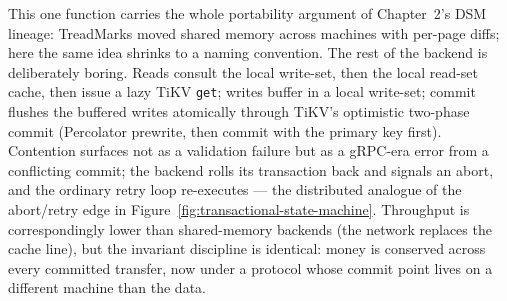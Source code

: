 This one function carries the whole portability argument of Chapter~2's DSM
lineage: TreadMarks moved shared memory across machines with per-page diffs;
here the same idea shrinks to a naming convention. The rest of the backend is
deliberately boring. Reads consult the local write-set, then the local
read-set cache, then issue a lazy TiKV \texttt{get}; writes buffer in a local
write-set; commit flushes the buffered writes atomically through TiKV's
optimistic two-phase commit (Percolator prewrite, then commit with the primary
key first). Contention surfaces not as a validation failure but as a gRPC-era
error from a conflicting commit; the backend rolls its transaction back and
signals an abort, and the ordinary retry loop re-executes --- the distributed
analogue of the abort/retry edge in Figure~\ref{fig:transactional-state-machine}.
Throughput is correspondingly lower than shared-memory backends (the network
replaces the cache line), but the invariant discipline is identical: money is
conserved across every committed transfer, now under a protocol whose commit
point lives on a different machine than the data.


